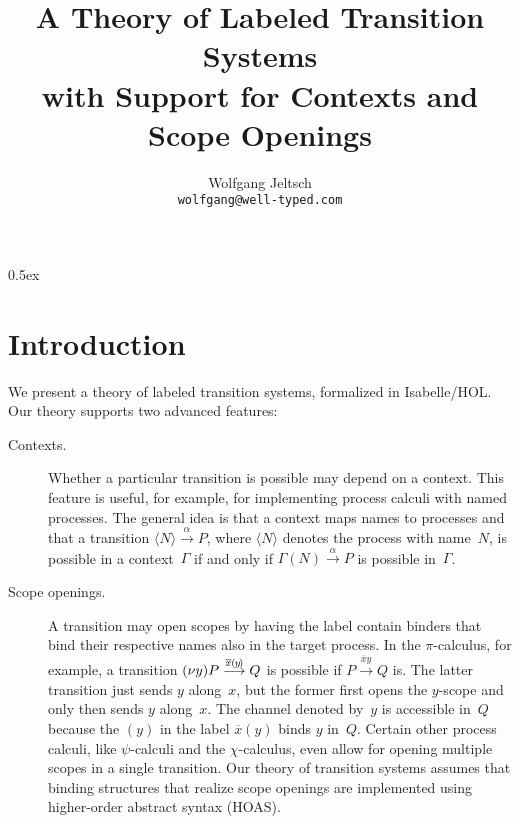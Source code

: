 \documentclass[a4paper,11pt]{article}
\newcommand{\openandsendexample}{
  (\nu y)P
  \overset{\overline{x}\hspace{-0.03em}(\hspace{-.06em}y\hspace{-.12em})}{\longrightarrow}
  Q
}
\begin{document}
\title{A Theory of Labeled Transition Systems\\with Support for Contexts and Scope Openings}
\author{Wolfgang Jeltsch\\\small\texttt{wolfgang@well-typed.com}}

\maketitle

\tableofcontents

\parindent 0pt\parskip 0.5ex

\section{Introduction}

We present a theory of labeled transition systems, formalized in Isabelle/HOL. Our theory supports
two advanced features:
\begin{description}

\item[Contexts.]

Whether a particular transition is possible may depend on a context. This feature is useful, for
example, for implementing process calculi with named processes. The general idea is that a context
maps names to processes and that a transition $\langle N\rangle \overset{\alpha}{\longrightarrow}
P$, where $\langle N\rangle$ denotes the process with name~$N$, is possible in a context~$\Gamma$ if
and only if $\Gamma(N) \overset{\alpha}{\longrightarrow} P$ is possible in~$\Gamma$.

\item[Scope openings.]

A transition may open scopes by having the label contain binders that bind their respective names
also in the target process. In the $\pi$-calculus, for example, a transition
$\openandsendexample$ is possible if $P \overset{\overline{x}y}{\longrightarrow} Q$ is. The latter
transition just sends $y$ along~$x$, but the former first opens the $y$-scope and only then sends
$y$ along~$x$. The channel denoted by~$y$ is accessible in~$Q$ because the $(y)$ in the label
$\overline{x}(y)$ binds $y$ in~$Q$. Certain other process calculi, like $\psi$-calculi and the
$\chi$-calculus, even allow for opening multiple scopes in a single transition. Our theory of
transition systems assumes that binding structures that realize scope openings are implemented using
higher-order abstract syntax (HOAS).

\end{description}


\end{document}
